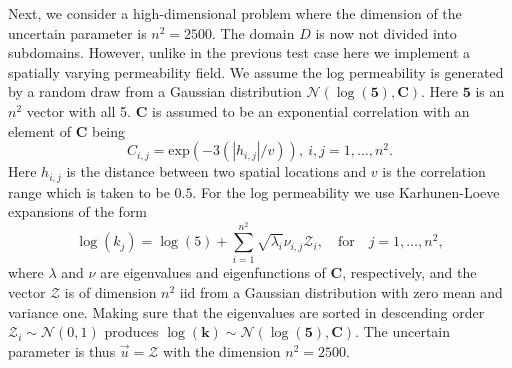\documentclass[12, a4paper]{article}
\numberwithin{equation}{section}
\begin{document}
Next, we consider a high-dimensional problem where the dimension of the uncertain parameter is $n^2 = 2500$. The domain $D$ is now not divided into subdomains. However, unlike in the previous test case  here we implement a spatially varying permeability field.
We assume the log permeability is generated by a random draw from a Gaussian distribution $\mathcal{N}(\log(\textbf{5}),\textbf{C})$. Here  $\textbf{5}$ is an  $n^2$ vector with all 5. $\textbf{C}$ is assumed to be an exponential correlation with an element of $\textbf{C}$ being 
\begin{equation*} 
{C}_{i,j}  = \text{exp}(-3(|h_{i,j}|/v)), \ i,j=1,\hdots,n^2.
\end{equation*}
Here $h_{i,j}$ is the distance between two spatial locations  and $v$ is the correlation range which is taken to be $0.5$.
For the log permeability we use Karhunen-Loeve expansions of the form
\begin{equation}\label{KLexp}
\log(k_j) = \log(5)+ \sum_{i=1}^{n^2} \sqrt{\lambda_{i}} \nu_{i,j}  \mathcal{Z}_{i}, \quad \mbox{for}  \quad j=1,\hdots,n^2,
\end{equation}
where $\lambda$ and $\nu$ are eigenvalues and eigenfunctions of $\textbf{C}$, respectively,  and the vector $\mathcal{Z}$ is of dimension  $n^2$ iid from a Gaussian distribution with zero mean and variance one.
Making sure that the eigenvalues are sorted in descending order $\mathcal{Z}_{i}  \sim \mathcal{N}(0,1)$ produces 
$\log(\textbf{k}) \sim \mathcal{N}(\log(\textbf{5}),\textbf{C})$.
The uncertain parameter is thus $\vec{u} =  \mathcal{Z}$ with the dimension $n^2 = 2500$.
\end{document}
